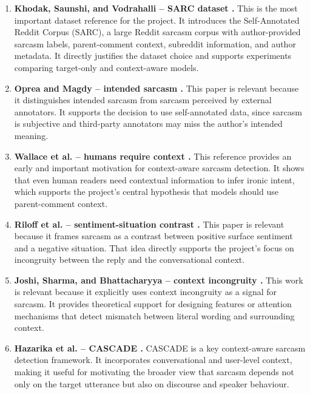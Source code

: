 \documentclass[%
 reprint,
 amsmath,amssymb,
 aps,
]{revtex4-2}
\begin{document}
\begin{enumerate}[leftmargin=*, itemsep=0.65em]

\item \textbf{Khodak, Saunshi, and Vodrahalli -- SARC dataset \cite{khodak2018large}.} This is the most important dataset reference for the project. It introduces the Self-Annotated Reddit Corpus (SARC), a large Reddit sarcasm corpus with author-provided sarcasm labels, parent-comment context, subreddit information, and author metadata. It directly justifies the dataset choice and supports experiments comparing target-only and context-aware models.

\item \textbf{Oprea and Magdy -- intended sarcasm \cite{oprea2020isarcasm}.} This paper is relevant because it distinguishes intended sarcasm from sarcasm perceived by external annotators. It supports the decision to use self-annotated data, since sarcasm is subjective and third-party annotators may miss the author's intended meaning.

\item \textbf{Wallace et al. -- humans require context \cite{wallace2014humans}.} This reference provides an early and important motivation for context-aware sarcasm detection. It shows that even human readers need contextual information to infer ironic intent, which supports the project's central hypothesis that models should use parent-comment context.

\item \textbf{Riloff et al. -- sentiment-situation contrast \cite{riloff2013sarcasm}.} This paper is relevant because it frames sarcasm as a contrast between positive surface sentiment and a negative situation. That idea directly supports the project's focus on incongruity between the reply and the conversational context.

\item \textbf{Joshi, Sharma, and Bhattacharyya -- context incongruity \cite{joshi2015harnessing}.} This work is relevant because it explicitly uses context incongruity as a signal for sarcasm. It provides theoretical support for designing features or attention mechanisms that detect mismatch between literal wording and surrounding context.

\item \textbf{Hazarika et al. -- CASCADE \cite{hazarika2018cascade}.} CASCADE is a key context-aware sarcasm detection framework. It incorporates conversational and user-level context, making it useful for motivating the broader view that sarcasm depends not only on the target utterance but also on discourse and speaker behaviour.


\end{enumerate}
\end{document}
